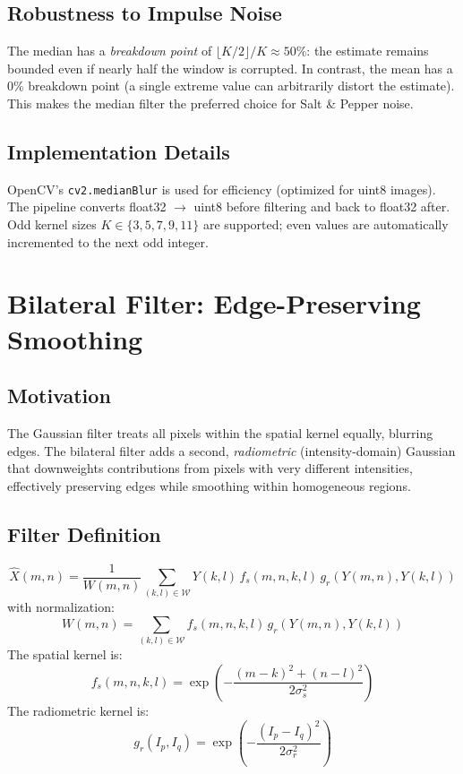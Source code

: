 \documentclass[10pt,conference]{IEEEtran}
\begin{document}
\subsection{Robustness to Impulse Noise}
The median has a \emph{breakdown point} of $\lfloor K/2 \rfloor / K \approx 50\%$: the estimate remains bounded even if nearly half the window is corrupted. In contrast, the mean has a 0\% breakdown point (a single extreme value can arbitrarily distort the estimate). This makes the median filter the preferred choice for Salt \& Pepper noise.

\subsection{Implementation Details}
OpenCV's \texttt{cv2.medianBlur} is used for efficiency (optimized for uint8 images). The pipeline converts float32 $\to$ uint8 before filtering and back to float32 after. Odd kernel sizes $K \in \{3, 5, 7, 9, 11\}$ are supported; even values are automatically incremented to the next odd integer.
\section{Bilateral Filter: Edge-Preserving Smoothing}

\subsection{Motivation}
The Gaussian filter treats all pixels within the spatial kernel equally, blurring edges. The bilateral filter adds a second, \emph{radiometric} (intensity-domain) Gaussian that downweights contributions from pixels with very different intensities, effectively preserving edges while smoothing within homogeneous regions.

\subsection{Filter Definition}
\begin{equation}
\hat{X}(m,n) = \frac{1}{W(m,n)}\sum_{(k,l)\in\mathcal{W}} Y(k,l)\,f_s(m,n,k,l)\,g_r(Y(m,n),Y(k,l))
\end{equation}
with normalization:
\begin{equation}
W(m,n) = \sum_{(k,l)\in\mathcal{W}} f_s(m,n,k,l)\,g_r(Y(m,n),Y(k,l))
\end{equation}
The spatial kernel is:
\begin{equation}
f_s(m,n,k,l) = \exp\!\left(-\frac{(m-k)^2+(n-l)^2}{2\sigma_s^2}\right)
\end{equation}
The radiometric kernel is:
\begin{equation}
g_r(I_p, I_q) = \exp\!\left(-\frac{(I_p - I_q)^2}{2\sigma_r^2}\right)
\end{equation}
\end{document}

